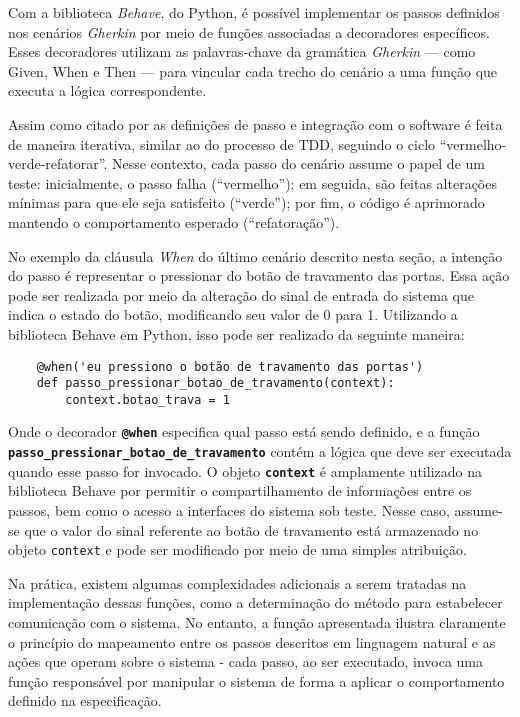 Com a biblioteca \textit{Behave}, do Python, é possível implementar os passos definidos nos cenários \textit{Gherkin} por meio de funções associadas a decoradores específicos. 
Esses decoradores utilizam as palavras-chave da gramática \textit{Gherkin} — como Given, When e Then — para vincular cada trecho do cenário a uma função que executa a 
lógica correspondente.

Assim como citado por  as definições de passo e integração com o software é feita de maneira iterativa, similar ao do processo de TDD, seguindo o ciclo 
“vermelho-verde-refatorar”. Nesse contexto, cada passo do cenário assume o papel de um teste: inicialmente, o passo falha (“vermelho”); em seguida, são feitas alterações 
mínimas para que ele seja satisfeito (“verde”); por fim, o código é aprimorado mantendo o comportamento esperado (“refatoração”).

No exemplo da cláusula \textit{When} do último cenário descrito nesta seção, a intenção do passo é representar o pressionar do botão de travamento das portas. Essa ação pode 
ser realizada por meio da alteração do sinal de entrada do sistema que indica o estado do botão, modificando seu valor de 0 para 1. Utilizando a biblioteca Behave em 
Python, isso pode ser realizado da seguinte maneira:

\begin{verbatim}
	@when('eu pressiono o botão de travamento das portas')
	def passo_pressionar_botao_de_travamento(context):
		context.botao_trava = 1
\end{verbatim}

Onde o decorador \texttt{\textbf{@when}} especifica qual passo está sendo definido, e a função \texttt{\textbf{passo\_pressionar\_botao\_de\_travamento}} contém a lógica que
deve ser executada quando esse passo for invocado. O objeto \texttt{\textbf{context}} é amplamente utilizado na biblioteca Behave por permitir o compartilhamento de 
informações entre os passos, bem como o 
acesso a interfaces do sistema sob teste. Nesse caso, assume-se que o valor do sinal referente ao botão de travamento está armazenado no objeto \texttt{context} e pode ser 
modificado por meio de uma simples atribuição.

Na prática, existem algumas complexidades adicionais a serem tratadas na implementação dessas funções, como a determinação do método para estabelecer comunicação 
com o sistema. No entanto, a função apresentada ilustra claramente o princípio do mapeamento entre os passos descritos 
em linguagem natural e as ações que operam sobre o sistema - cada passo, ao ser executado, invoca uma função responsável por manipular o sistema de forma a aplicar o 
comportamento definido na especificação.

